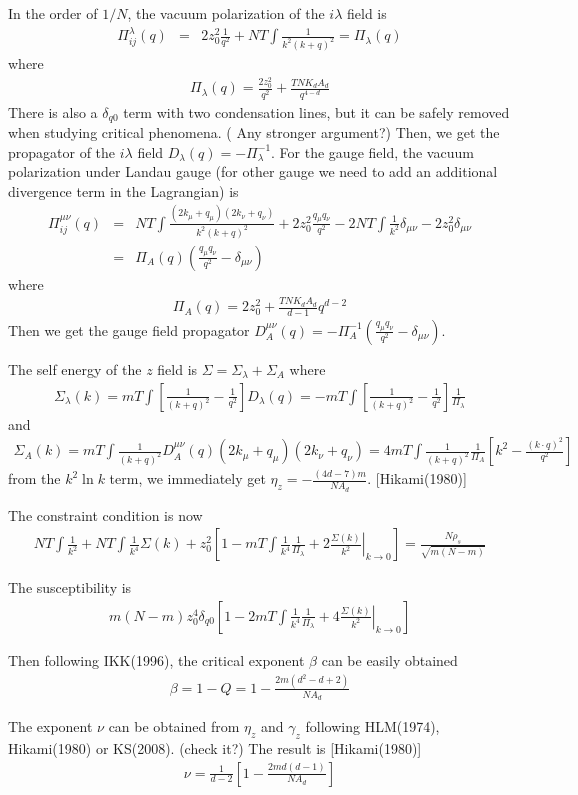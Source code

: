\documentclass[aps,notitlepage]{revtex4-1}
\newcommand{\bea}{\begin{eqnarray}}
\newcommand{\eea}{\end{eqnarray}}
\begin{document}
In the order of $1/N$, the vacuum polarization of the $i\lambda$ field is
\bea \Pi_{ij}^\lambda(q)&=&2z_0^2\frac{1}{q^2} + NT\int \frac{1}{k^2(k+q)^2} = \Pi_\lambda(q) \eea
where \bea \Pi_\lambda(q)=\frac{2z_0^2}{q^2}+\frac{TNK_dA_d}{q^{4-d}} \eea 
There is also a $\delta_{q0}$ term with two condensation lines, but it can be safely removed when studying critical phenomena. ({\color{red} Any stronger argument?}) Then, we get the propagator of the $i\lambda$ field $D_\lambda(q)=-\Pi_\lambda^{-1}$. 
For the gauge field, the vacuum polarization under Landau gauge (for other gauge we need to add an additional divergence term in the Lagrangian) is
\bea \Pi_{ij}^{\mu\nu}(q) &=& NT\int \frac{(2k_\mu+q_\mu)(2k_\nu+q_\nu)}{k^2(k+q)^2} + 2z_0^2 \frac{q_\mu q_\nu}{q^2} - 2NT\int \frac{1}{k^2}\delta_{\mu\nu} - 2z_0^2 \delta_{\mu\nu} \nonumber\\ &=&\Pi_A(q)\left(\frac{q_\mu q_\nu}{q^2}-\delta_{\mu\nu}\right)\eea
where \bea \Pi_A(q)= 2z_0^2+\frac{TNK_dA_d}{d-1} q^{d-2} \eea
Then we get the gauge field propagator $D_A^{\mu\nu}(q)=-\Pi_A^{-1}\left(\frac{q_\mu q_\nu}{q^2}-\delta_{\mu\nu}\right)$. 

The self energy of the $z$ field is $\Sigma=\Sigma_\lambda+\Sigma_A$ where
\bea \Sigma_\lambda(k)=mT\int \left[\frac{1}{(k+q)^2}-\frac{1}{q^2}\right]D_\lambda(q)=-mT\int \left[\frac{1}{(k+q)^2}-\frac{1}{q^2}\right]\frac{1}{\Pi_\lambda} \eea
and
\bea \Sigma_A(k)=mT\int \frac{1}{(k+q)^2} D_A^{\mu\nu}(q) (2k_\mu+q_\mu) (2k_\nu+q_\nu) = 4mT\int \frac{1}{(k+q)^2}\frac{1}{\Pi_A}\left[ k^2-\frac{(k\cdot q)^2}{q^2} \right] \eea 
from the $k^2\ln k$ term, we immediately get $\eta_z=-\frac{(4d-7)m}{NA_d}$. [Hikami(1980)]

The constraint condition is now
\bea NT\int \frac{1}{k^2} + NT\int \frac{1}{k^4}\Sigma(k) + z_0^2 \left[ 1-  mT\int \frac{1}{k^4} \frac{1}{\Pi_\lambda} + 2 \left.\frac{\Sigma(k)}{k^2}\right|_{k\rightarrow0}\right] = \frac{N\rho_s}{\sqrt{m(N-m)}} \eea 

The susceptibility is 
\bea m(N-m)z_0^4\delta_{q0}\left[  1-  2mT\int \frac{1}{k^4} \frac{1}{\Pi_\lambda} + 4 \left.\frac{\Sigma(k)}{k^2}\right|_{k\rightarrow0} \right] \eea

Then following IKK(1996), the critical exponent $\beta$ can be easily obtained
\bea \beta=1-Q=1-\frac{2m(d^2-d+2)}{NA_d} \eea 

The exponent $\nu$ can be obtained from $\eta_z$ and $\gamma_z$ following HLM(1974), Hikami(1980) or KS(2008). (check it?) The result is [Hikami(1980)]
\bea \nu=\frac{1}{d-2}\left[ 1-\frac{2md(d-1)}{NA_d} \right] \eea
\end{document}
